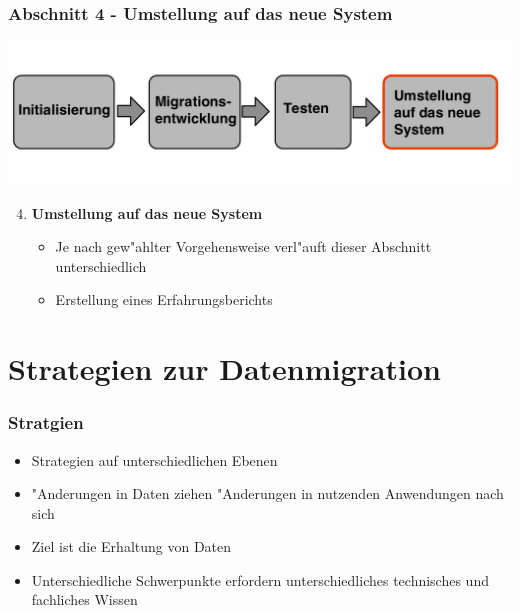 \documentclass{beamer}
\begin{document}
	\begin{frame}
		\frametitle{Abschnitt 4 - Umstellung auf das neue System}
		
		\centering
		\includegraphics[width=\textwidth]{../images/prozessmodell4t.png}\\
		
		\begin{enumerate}
			\setcounter{enumi}{3}
						
			\item \textbf{Umstellung auf das neue System}
			\begin{itemize}
				\item Je nach gew"ahlter Vorgehensweise verl"auft dieser Abschnitt unterschiedlich
				\newline
				\item Erstellung eines Erfahrungsberichts
			\end{itemize}
			
		\end{enumerate}
	\end{frame}
	\section{Strategien zur Datenmigration}
	
	\begin{frame}
		\frametitle{Stratgien}
		
		\begin{itemize}
			\item Strategien auf unterschiedlichen Ebenen
			\item "Anderungen in Daten ziehen "Anderungen in nutzenden Anwendungen nach sich
			\item Ziel ist die Erhaltung von Daten
			\item Unterschiedliche Schwerpunkte erfordern unterschiedliches technisches und fachliches Wissen
		\end{itemize}
	\end{frame}
	
\end{document}
